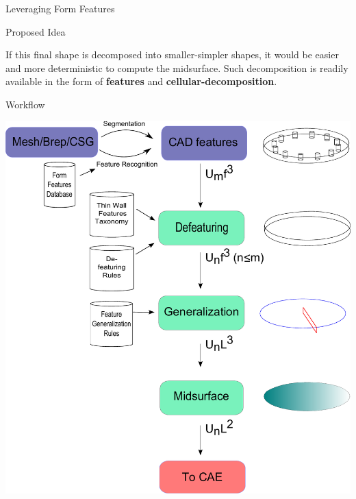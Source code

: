 \documentclass[final]{beamer}
\newlength{\onecolumnwidth}
\begin{document}
\begin{frame}[t]
\begin{columns}[t]
\begin{column}{\onecolumnwidth}
\begin{block}{Leveraging Form Features}
	\end{block}

						
	\begin{block}{Proposed Idea}
	
	If this final shape is decomposed into smaller-simpler shapes, it would be easier and more deterministic to compute the midsurface. Such decomposition is readily available in the form of \textbf{features} and \textbf{cellular-decomposition}.
%	
%		
%		
%		
%		
	\end{block}


	\begin{block}{Workflow}
	
		\begin{center}
			\includegraphics[width=0.9\linewidth]{../Common/images/SystemArchitecture2.pdf} 
		\end{center}
		

\end{block}
\end{column}
\end{columns}
\end{frame}
\end{document}
